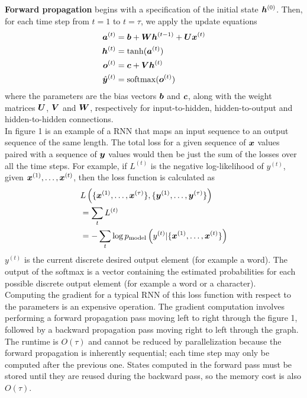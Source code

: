 \begin{multicols}{2}
\begin{figure}[H]
	\end{figure}
	
	\textbf{Forward propagation} begins with a specification of the initial state ${\bm{h}}^{(0)}$.
	Then, for each time step from $t=1$ to $t=\tau$, we apply the update equations
	\begin{align*}
	{\bm{a}}^{(t)} &= {\bm{b}}+{\bm{W}}{\bm{h}}^{(t-1)} +{\bm{U}}{\bm{x}}^{(t)}\\
	{\bm{h}}^{(t)} &= \tanh({\bm{a}}^{(t)})\\
	{\bm{o}}^{(t)} &= {\bm{c}}+{\bm{V}}{\bm{h}}^{(t)}\\
	\hat{{\bm{y}}}^{(t)} &= \mathrm{softmax}({\bm{o}}^{(t)})
	\end{align*}
	where the parameters are the bias vectors ${\bm{b}}$ and ${\bm{c}}$, along with the weight matrices ${\bm{U}}$, ${\bm{V}}$ and ${\bm{W}}$, respectively for input-to-hidden, hidden-to-output and hidden-to-hidden connections.\\
	
	In figure 1 is an example of a RNN that maps an input sequence to an output sequence of the same length.
	The total loss for a given sequence of ${\bm{x}}$ values paired with a sequence of ${\bm{y}}$ values would then be just the sum of the losses over all the time steps.
	For example, if $L^{(t)}$ is the negative log-likelihood of $y^{(t)}$, given ${\bm{x}}^{(1)},\dots,{\bm{x}}^{(t)}$, then the loss function is calculated as
	\begin{align*}
	& L\left( \{ {\bm{x}}^{(1)},\dots,{\bm{x}}^{(\tau)} \}, \{ {\bm{y}}^{(1)},\dots,{\bm{y}}^{(\tau)} \} \right)\\
	&= \sum_t L^{(t)}\\
	&= -\sum_t \log p_{\text{model}}\left(y^{(t)}| \{ {\bm{x}}^{(1)},\dots,{\bm{x}}^{(t)} \} \right)
	\end{align*}
	$y^{(t)}$ is the current discrete desired output element (for example a word).
	The output of the softmax is a vector containing the estimated probabilities for each possible discrete output element (for example a word or a character).\\
	
	Computing the gradient for a typical RNN of this loss function with respect to the parameters is an expensive operation.
	The gradient computation involves performing a forward propagation pass moving left to right through the figure 1, followed by a backward propagation pass moving right to left through the graph.
	The runtime is $O(\tau)$ and cannot be reduced by parallelization because the forward propagation is inherently sequential; each time step may only be computed after the previous one.
	States computed in the forward pass must be stored until they are reused during the backward pass, so the memory cost is also $O(\tau)$.\\
	

\end{multicols}
